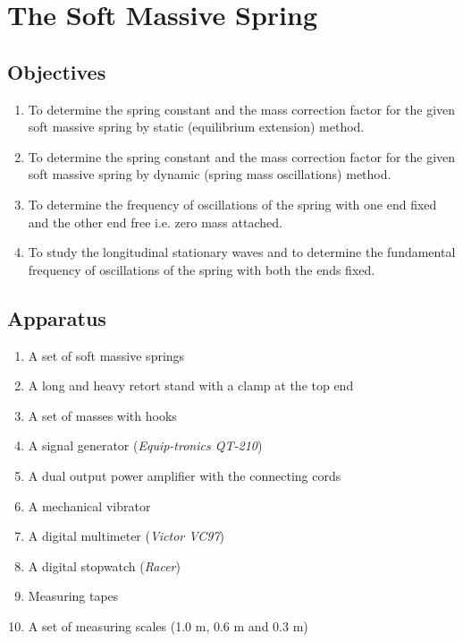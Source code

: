 
\chapter{The Soft Massive Spring}

\section*{Objectives}

\begin{enumerate}
\item To determine the spring constant and the mass correction factor for the given soft massive
spring by static (equilibrium extension) method.
\item To determine the spring constant and the mass correction factor for the given soft massive
spring by dynamic (spring mass oscillations) method.
\item To determine the frequency of oscillations of the spring with one end fixed and the other
end free i.e. zero mass attached.
\item To study the longitudinal stationary waves and to determine the fundamental frequency of
oscillations of the spring with both the ends fixed.
\end{enumerate}

\section*{Apparatus}

\begin{enumerate}[label=\arabic*)]
\itemsep0em
\item A set of soft massive springs
\item A long and heavy retort stand with a clamp at the top end 
\item A set of masses with hooks
\item A signal generator (\textit{Equip-tronics QT-210})
\item A dual output power amplifier with the connecting cords
\item A mechanical vibrator
\item A digital multimeter (\textit{Victor VC97})
\item A digital stopwatch (\textit{Racer})
\item Measuring tapes
\item A set of measuring scales (1.0 m, 0.6 m and 0.3 m)
\end{enumerate}

